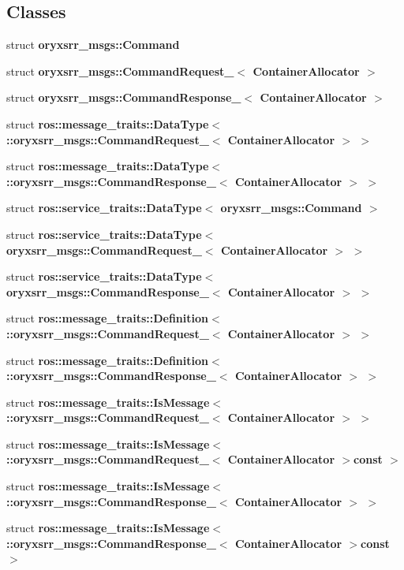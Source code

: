 \subsection*{\-Classes}
\begin{DoxyCompactItemize}
\item 
struct {\bf oryxsrr\-\_\-msgs\-::\-Command}
\item 
struct {\bf oryxsrr\-\_\-msgs\-::\-Command\-Request\-\_\-$<$ Container\-Allocator $>$}
\item 
struct {\bf oryxsrr\-\_\-msgs\-::\-Command\-Response\-\_\-$<$ Container\-Allocator $>$}
\item 
struct {\bf ros\-::message\-\_\-traits\-::\-Data\-Type$<$ \-::oryxsrr\-\_\-msgs\-::\-Command\-Request\-\_\-$<$ Container\-Allocator $>$ $>$}
\item 
struct {\bf ros\-::message\-\_\-traits\-::\-Data\-Type$<$ \-::oryxsrr\-\_\-msgs\-::\-Command\-Response\-\_\-$<$ Container\-Allocator $>$ $>$}
\item 
struct {\bf ros\-::service\-\_\-traits\-::\-Data\-Type$<$ oryxsrr\-\_\-msgs\-::\-Command $>$}
\item 
struct {\bf ros\-::service\-\_\-traits\-::\-Data\-Type$<$ oryxsrr\-\_\-msgs\-::\-Command\-Request\-\_\-$<$ Container\-Allocator $>$ $>$}
\item 
struct {\bf ros\-::service\-\_\-traits\-::\-Data\-Type$<$ oryxsrr\-\_\-msgs\-::\-Command\-Response\-\_\-$<$ Container\-Allocator $>$ $>$}
\item 
struct {\bf ros\-::message\-\_\-traits\-::\-Definition$<$ \-::oryxsrr\-\_\-msgs\-::\-Command\-Request\-\_\-$<$ Container\-Allocator $>$ $>$}
\item 
struct {\bf ros\-::message\-\_\-traits\-::\-Definition$<$ \-::oryxsrr\-\_\-msgs\-::\-Command\-Response\-\_\-$<$ Container\-Allocator $>$ $>$}
\item 
struct {\bf ros\-::message\-\_\-traits\-::\-Is\-Message$<$ \-::oryxsrr\-\_\-msgs\-::\-Command\-Request\-\_\-$<$ Container\-Allocator $>$ $>$}
\item 
struct {\bf ros\-::message\-\_\-traits\-::\-Is\-Message$<$ \-::oryxsrr\-\_\-msgs\-::\-Command\-Request\-\_\-$<$ Container\-Allocator $>$const  $>$}
\item 
struct {\bf ros\-::message\-\_\-traits\-::\-Is\-Message$<$ \-::oryxsrr\-\_\-msgs\-::\-Command\-Response\-\_\-$<$ Container\-Allocator $>$ $>$}
\item 
struct {\bf ros\-::message\-\_\-traits\-::\-Is\-Message$<$ \-::oryxsrr\-\_\-msgs\-::\-Command\-Response\-\_\-$<$ Container\-Allocator $>$const  $>$}

\end{DoxyCompactItemize}
